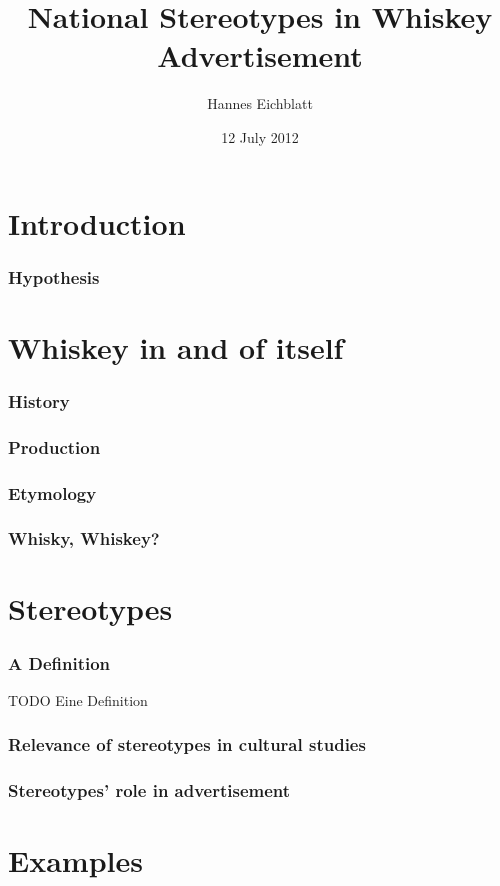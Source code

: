 \documentclass{beamer}
\title{National Stereotypes in Whiskey Advertisement}
\author{Hannes Eichblatt}
\date{12 July 2012}
\begin{document}
\maketitle
\frame{\tableofcontents[currentsection]}

\section{Introduction}

\begin{frame}
 \frametitle{Hypothesis}
\end{frame}

\section{Whiskey in and of itself}

\begin{frame}
 \frametitle{History}
\end{frame}

\begin{frame}
 \frametitle{Production}
\end{frame}

\begin{frame}
 \frametitle{Etymology}
\end{frame}

\begin{frame}
 \frametitle{Whisky, Whiskey?}
\end{frame}
  
\section{Stereotypes}

\begin{frame}
 \frametitle{A Definition}
\begin{Definition}
    TODO Eine Definition
  \end{Definition}
\end{frame}

\begin{frame}
 \frametitle{Relevance of stereotypes in cultural studies}
\end{frame}

\begin{frame}
 \frametitle{Stereotypes' role in advertisement}
\end{frame}

\section{Examples}
\end{document}
